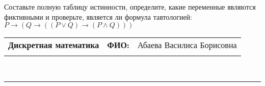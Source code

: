 \documentclass[10pt]{exam}
\newcommand{\class}{Дискретная математика}
\newcommand{\examdate}{}
\begin{document}
\begin{questions}
\begin{enumerate} [a)]
\end{enumerate}\question Составьте полную таблицу истинности, определите, какие переменные являются фиктивными и проверьте, является ли формула тавтологией:
$ P \rightarrow (Q \rightarrow ((P \lor Q) \rightarrow (P \land Q)))$

\end{questions}
\newpage
\begin{flushright}
\begin{tabular}{p{2.8in} r l}
\textbf{\class} & \textbf{ФИО:} &Абаева Василиса Борисовна
\\

\textbf{\examdate} &&\\
\end{tabular}\\
\end{flushright}
\rule[1ex]{\textwidth}{.1pt}
\end{document}
